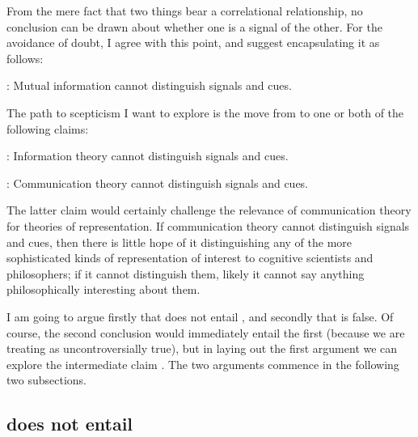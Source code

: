 \documentclass[12pt]{article}
\begin{document}
From the mere fact that two things bear a correlational relationship, no conclusion can be drawn about whether one is a signal of the other.
For the avoidance of doubt, I agree with this point, and suggest encapsulating it as follows:

\begin{myquote}
\ami: Mutual information cannot distinguish signals and cues.
\end{myquote}

\noindent The path to scepticism I want to explore is the move from \ami{} to one or both of the following claims:

\begin{myquote}
\ait: Information theory cannot distinguish signals and cues.
\end{myquote}

\begin{myquote}
\act: Communication theory cannot distinguish signals and cues.
\end{myquote}

\noindent The latter claim would certainly challenge the relevance of communication theory for theories of representation.
If communication theory cannot distinguish signals and cues, then there is little hope of it distinguishing any of the more sophisticated kinds of representation of interest to cognitive scientists and philosophers; if it cannot distinguish them, likely it cannot say anything philosophically interesting about them.

I am going to argue firstly that \ami{} does not entail \act{}, and secondly that \act{} is false.
Of course, the second conclusion would immediately entail the first (because we are treating \ami{} as uncontroversially true), but in laying out the first argument we can explore the intermediate claim \ait{}.
The two arguments commence in the following two subsections.

\subsection{\ami{} does not entail \act{}}
\end{document}
